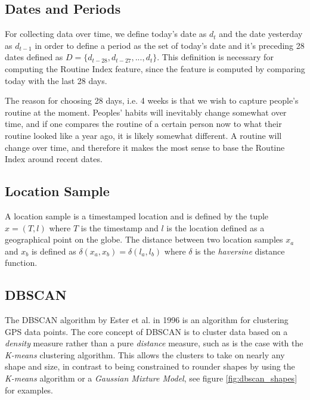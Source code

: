 \subsection{Dates and Periods}
For collecting data over time, we define today's date as $d_t$ and the date yesterday as $d_{t-1}$ in order to define a period as the set of today's date and it's preceding 28 dates defined as $D = \{d_{t-28}, d_{t-27}, ..., d_{t}\}$. This definition is necessary for computing the Routine Index feature, since the feature is computed by comparing today with the last 28 days. 

The reason for choosing 28 days, i.e. 4 weeks is that we wish to capture people's routine at the moment. Peoples' habits will inevitably change somewhat over time, and if one compares the routine of a certain person now to what their routine looked like a year ago, it is likely somewhat different. A routine will change over time, and therefore it makes the most sense to base the Routine Index around recent dates.

\subsection{Location Sample}
A location sample is a timestamped location and is defined by the tuple $x = (T, l)$ where $T$ is the  timestamp and $l$ is the location defined as a geographical point on the globe. The distance between two location samples $x_a$ and $x_b$ is defined as $\delta(x_a, x_b) = \delta(l_a, l_b)$ where $\delta$ is the \textit{haversine} distance function.


\subsection{DBSCAN}
The DBSCAN algorithm by Ester et al. in 1996 \cite{density-based-1996} is an algorithm for clustering GPS data points. The core concept of DBSCAN is to cluster data based on a \textit{density} measure rather than a pure \textit{distance} measure, such as is the case with the \textit{K-means} clustering algorithm. This allows the clusters to take on nearly any shape and size, in contrast to being constrained to rounder shapes by using the \textit{K-means} algorithm or a \textit{Gaussian Mixture Model}, see figure \ref{fig:dbscan_shapes} for examples.\\

